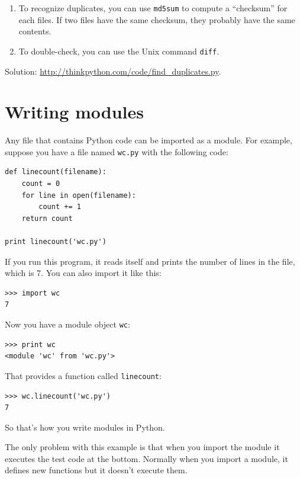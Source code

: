 \documentclass[10pt]{book}
\begin{document}
\begin{CJK}{UTF8}{gbsn}
\begin{exercise}
\begin{enumerate}
\item To recognize duplicates, you can use {\tt md5sum}
to compute a ``checksum'' for each files.  If two files have
the same checksum, they probably have the same contents.

\item To double-check, you can use the Unix command {\tt diff}.

\end{enumerate}

Solution: \url{http://thinkpython.com/code/find_duplicates.py}.

\end{exercise}


\section{Writing modules}
\label{modules}

Any file that contains Python code can be imported as a module.
For example, suppose you have a file named {\tt wc.py} with the following
code:

\begin{verbatim}
def linecount(filename):
    count = 0
    for line in open(filename):
        count += 1
    return count

print linecount('wc.py')
\end{verbatim}
%
If you run this program, it reads itself and prints the number
of lines in the file, which is 7.
You can also import it like this:

\begin{verbatim}
>>> import wc
7
\end{verbatim}
%
Now you have a module object {\tt wc}:

\begin{verbatim}
>>> print wc
<module 'wc' from 'wc.py'>
\end{verbatim}
%
That provides a function called \verb"linecount":

\begin{verbatim}
>>> wc.linecount('wc.py')
7
\end{verbatim}
%
So that's how you write modules in Python.

The only problem with this example is that when you import
the module it executes the test code at the bottom.  Normally
when you import a module, it defines new functions but it
doesn't execute them.


\end{CJK}
\end{document}
